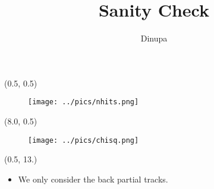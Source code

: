 \documentclass[10pt, xcolor={dvipsnames}, aspectratio = 169]{beamer}
\title{Sanity Check}
\author{Dinupa}
\begin{document}
\begin{frame}
\maketitle
\end{frame}


\begin{frame}[fragile]

\begin{textblock}{7.0}(0.5, 0.5)
\begin{figure}
\centering
\texttt{[image: ../pics/nhits.png]}
\end{figure}
\end{textblock}

\begin{textblock}{7.0}(8.0, 0.5)
\begin{figure}
\centering
\texttt{[image: ../pics/chisq.png]}
\end{figure}
\end{textblock}

\begin{textblock}{10.0}(0.5, 13.)
\begin{itemize}

	\item We only consider the back partial tracks.
\end{itemize}
\end{textblock}

\end{frame}
\end{document}
